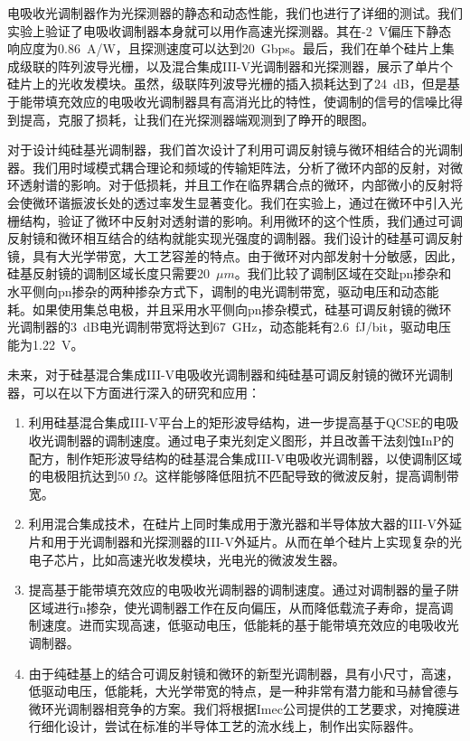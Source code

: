 电吸收光调制器作为光探测器的静态和动态性能，我们也进行了详细的测试。我们实验上验证了电吸收调制器本身就可以用作高速光探测器。其在-2~V偏压下静态响应度为0.86~A/W，且探测速度可以达到20~Gbps。最后，我们在单个硅片上集成级联的阵列波导光栅，以及混合集成III-V光调制器和光探测器，展示了单片个硅片上的光收发模块。虽然，级联阵列波导光栅的插入损耗达到了24~dB，但是基于能带填充效应的电吸收光调制器具有高消光比的特性，使调制的信号的信噪比得到提高，克服了损耗，让我们在光探测器端观测到了睁开的眼图。

对于设计纯硅基光调制器，我们首次设计了利用可调反射镜与微环相结合的光调制器。我们用时域模式耦合理论和频域的传输矩阵法，分析了微环内部的反射，对微环透射谱的影响。对于低损耗，并且工作在临界耦合点的微环，内部微小的反射将会使微环谐振波长处的透过率发生显著变化。我们在实验上，通过在微环中引入光栅结构，验证了微环中反射对透射谱的影响。利用微环的这个性质，我们通过可调反射镜和微环相互结合的结构就能实现光强度的调制器。我们设计的硅基可调反射镜，具有大光学带宽，大工艺容差的特点。由于微环对内部发射十分敏感，因此，硅基反射镜的调制区域长度只需要20~$\mu m$。我们比较了调制区域在交趾pn掺杂和水平侧向pn掺杂的两种掺杂方式下，调制的电光调制带宽，驱动电压和动态能耗。如果使用集总电极，并且采用水平侧向pn掺杂模式，硅基可调反射镜的微环光调制器的3~dB电光调制带宽将达到67~GHz，动态能耗有2.6~fJ/bit，驱动电压能为1.22~V。

未来，对于硅基混合集成III-V电吸收光调制器和纯硅基可调反射镜的微环光调制器，可以在以下方面进行深入的研究和应用：
\begin{enumerate}[(1)]
	\item 利用硅基混合集成III-V平台上的矩形波导结构，进一步提高基于QCSE的电吸收光调制器的调制速度。通过电子束光刻定义图形，并且改善干法刻蚀InP的配方，制作矩形波导结构的硅基混合集成III-V电吸收光调制器，以使调制区域的电极阻抗达到$50~\Omega$。这样能够降低阻抗不匹配导致的微波反射，提高调制带宽。
	\item 利用混合集成技术，在硅片上同时集成用于激光器和半导体放大器的III-V外延片和用于光调制器和光探测器的III-V外延片。从而在单个硅片上实现复杂的光电子芯片，比如高速光收发模块，光电光的微波发生器。
	\item 提高基于能带填充效应的电吸收光调制器的调制速度。通过对调制器的量子阱区域进行n掺杂，使光调制器工作在反向偏压，从而降低载流子寿命，提高调制速度。进而实现高速，低驱动电压，低能耗的基于能带填充效应的电吸收光调制器。
	\item 由于纯硅基上的结合可调反射镜和微环的新型光调制器，具有小尺寸，高速，低驱动电压，低能耗，大光学带宽的特点，是一种非常有潜力能和马赫曾德与微环光调制器相竞争的方案。我们将根据Imec公司提供的工艺要求，对掩膜进行细化设计，尝试在标准的半导体工艺的流水线上，制作出实际器件。
\end{enumerate}
